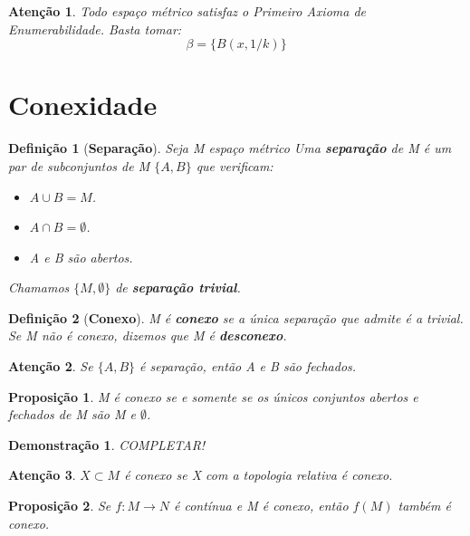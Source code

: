 \documentclass{article}
\newtheorem*{definition}{Definição}
\newtheorem*{atencao}{Atenção}
\newtheorem*{proposicao}{Proposição}
\newtheorem*{prova}{Demonstração}
\begin{document}
\begin{atencao}
    Todo espaço métrico satisfaz o Primeiro Axioma de Enumerabilidade. Basta tomar:
    \[\beta = \{ B(x, 1/k) \}\]
\end{atencao}

\section{Conexidade}

\begin{definition}[\textbf{Separação}]
    Seja M espaço métrico Uma \textbf{separação} de M é um par de subconjuntos de M $\{ A, B\}$ que verificam:
    \begin{itemize}
        \item $A \cup B = M$.
        \item $A \cap B = \emptyset$.
        \item A e B são abertos.
    \end{itemize}
    Chamamos $\{M, \emptyset\}$ de \textbf{separação trivial}.
\end{definition}

\begin{definition}[\textbf{Conexo}]
    M é \textbf{conexo} se a única separação que admite é a trivial. Se M não é conexo, dizemos que M é \textbf{desconexo}.
\end{definition}

\begin{atencao}
    Se $\{A, B\}$ é separação, então A e B são fechados.
\end{atencao}

\begin{proposicao}
    M é conexo se e somente se os únicos conjuntos abertos e fechados de M são M e $\emptyset$.
\end{proposicao}

\begin{prova}
    COMPLETAR!
\end{prova}

\begin{atencao}
    $X \subset M$ é conexo se X com a topologia relativa é conexo. 
\end{atencao}

\begin{proposicao}
    Se $f: M \rightarrow N$ é contínua e M é conexo, então $f(M)$ também é conexo.
\end{proposicao}
\end{document}
